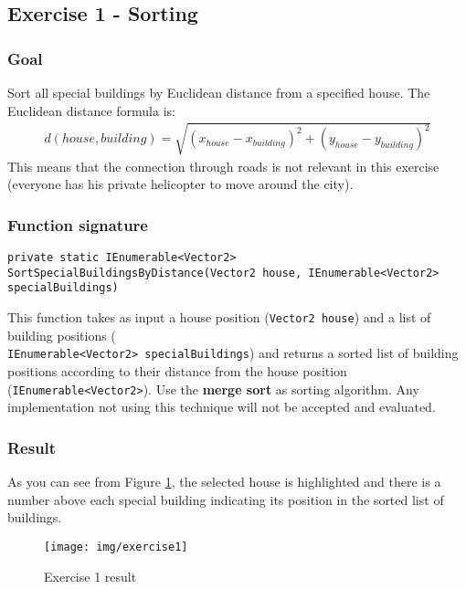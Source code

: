 \newpage
\subsection*{Exercise 1 - Sorting}

\subsubsection*{Goal}
Sort all special buildings by Euclidean distance from a specified house. The Euclidean distance formula is:
\begin{align*}
d(house,building) = \sqrt{(x_{house} - x_{building})^{2} + (y_{house} - y_{building})^{2} } 
\end{align*}
This means that the connection through roads is not relevant in this exercise (everyone has his private helicopter to move around the city).

\subsubsection*{Function signature} 
\begin{lstlisting}
private static IEnumerable<Vector2> SortSpecialBuildingsByDistance(Vector2 house, IEnumerable<Vector2> specialBuildings)
\end{lstlisting}

This function takes as input a house position (\texttt{Vector2 house}) and a list of building positions (\\ \texttt{IEnumerable<Vector2> specialBuildings}) and returns a sorted list of building positions according to their distance from the house position (\texttt{IEnumerable<Vector2>}). Use the \textbf{merge sort} as sorting algorithm. Any implementation not using this technique will not be accepted and evaluated.\\

\subsubsection*{Result}
As you can see from Figure \ref{img:Ex1}, the selected house is highlighted and there is a number above each special building indicating its position in the sorted list of buildings. 

\begin{figure}[!h]
\centering
\texttt{[image: img/exercise1]}
\caption{Exercise 1 result}
\label{img:Ex1}
\end{figure}

\newpage
